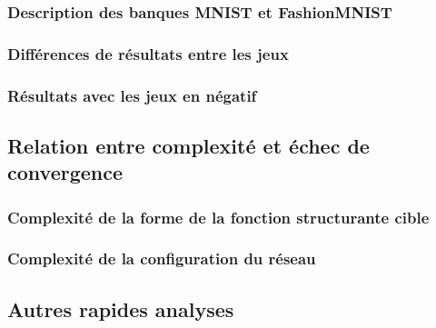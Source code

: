 \documentclass[12pt, twoside, letterpaper, french]{article}
\begin{document}
\subsubsection{Description des banques MNIST et FashionMNIST}
\vspace{0.2cm}

\newpage

\subsubsection{Différences de résultats entre les jeux}
\vspace{0.2cm}


\subsubsection{Résultats avec les jeux en négatif}
\vspace{0.3cm}

\newpage

\subsection{Relation entre complexité et échec de convergence}

\subsubsection{Complexité de la forme de la fonction structurante cible}
\vspace{0.2cm}


\subsubsection{Complexité de la configuration du réseau}
\vspace{0.3cm}

\newpage

\subsection{Autres rapides analyses}
\end{document}
